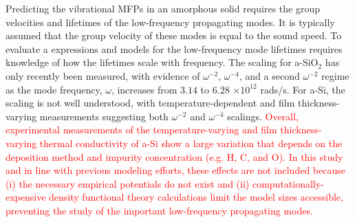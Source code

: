 \documentclass[aps,prb,twocolumn,superscriptaddress,footinbib,amsmath,amssymb,floatfix]{revtex4}
\begin{document}
Predicting the vibrational MFPs in an amorphous solid 
requires the group velocities and lifetimes 
of the low-frequency propagating modes.
\cite{freeman_thermal_1986,graebner_phonon_1986,
love_estimate_1990,feldman_thermal_1993,cahill_thermal_1994,
feldman_numerical_1999,zink_thermal_2006,baldi_thermal_2008,
liu_high_2009,yang_anomalously_2010,hondongwa_ultrasonic_2011} 
It is typically assumed that 
the group velocity of these modes is equal to the sound speed. 
To evaluate a expressions and models for the low-frequency 
mode lifetimes requires knowledge of how the lifetimes 
scale with frequency.
The scaling for a-SiO$_2$ has only recently been measured, 
with evidence of $\omega^{-2}$, $\omega^{-4}$, and a 
second $\omega^{-2}$ regime as the mode frequency, $\omega$, 
increases from $3.14$ to $6.28$ $\times 10^{12}$ rads/s.
\cite{masciovecchio_evidence_2006,
baldi_sound_2010,baldi_elastic_2011,baldi_emergence_2013} 
For a-Si, the scaling is not well understood, 
with temperature-dependent and film thickness-varying measurements
suggesting both $\omega^{-2}$ and $\omega^{-4}$ scalings.
\cite{pompe_thermal_1988,hasselman_thermal_1989,
kuo_thermal_1992,feldman_thermal_1993,cahill_thermal_1994,
wada_thermal_1996,feldman_numerical_1999,moon_thermal_2002,
zink_thermal_2006,zink_excess_2006,liu_high_2009,
yang_anomalously_2010,he_heat_2011,hondongwa_ultrasonic_2011} 
\textcolor{red}{
Overall, experimental measurements of the temperature-varying 
and film thickness-varying thermal conductivity of a-Si show a large 
variation that depends on the deposition method and impurity 
concentration (e.g. H, C, and O).
\cite{liu_high_2009,yang_anomalously_2010,vacher_attenuation_1980,
li_effect_2011} 
In this study and in line with previous modeling efforts, 
these effects are not included because (i) 
the necessary empirical potentials do not exist and (ii) 
computationally-expensive density functional theory calculations 
limit the model sizes accessible,
\cite{feldman_thermal_1993,feldman_numerical_1999,
bernstein_structural_2006,liu_high_2009,yang_anomalously_2010} 
preventing the study of the important low-frequency propagating 
modes.}
\end{document}
